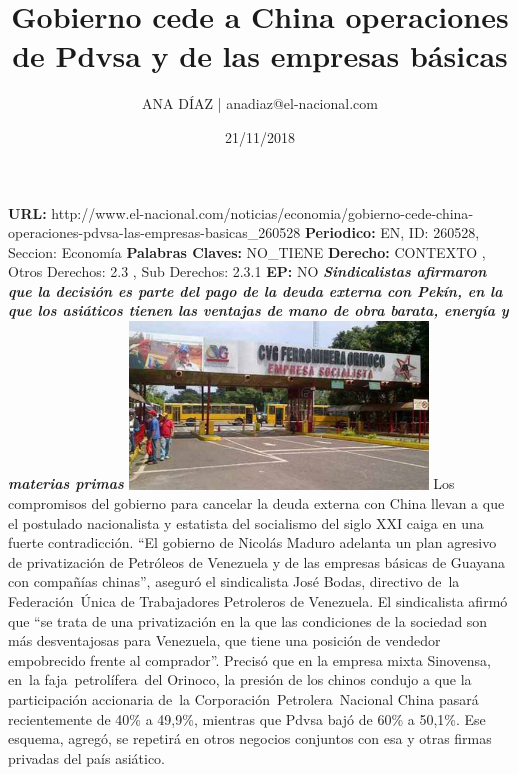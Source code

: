 \documentclass{article}%
\title{\textbf{Gobierno cede a China operaciones de Pdvsa y de las empresas básicas}}%
\author{ANA DÍAZ | anadiaz@el{-}nacional.com}%
\date{21/11/2018}%
\begin{document}
%
\normalsize%
\maketitle%
\textbf{URL: }%
http://www.el{-}nacional.com/noticias/economia/gobierno{-}cede{-}china{-}operaciones{-}pdvsa{-}las{-}empresas{-}basicas\_260528\newline%
%
\textbf{Periodico: }%
EN, %
ID: %
260528, %
Seccion: %
Economía\newline%
%
\textbf{Palabras Claves: }%
NO\_TIENE\newline%
%
\textbf{Derecho: }%
CONTEXTO%
, Otros Derechos: %
2.3%
, Sub Derechos: %
2.3.1%
\newline%
%
\textbf{EP: }%
NO\newline%
\newline%
%
\textbf{\textit{Sindicalistas afirmaron que la decisión es parte del pago de la deuda externa con Pekín, en la que los asiáticos tienen las ventajas de mano de obra barata, energía y materias primas}}%
\newline%
\newline%
%
\includegraphics[width=300px]{219.jpg}%
\newline%
%
Los compromisos del gobierno para cancelar la deuda externa con China llevan a que el postulado nacionalista y estatista del socialismo del siglo XXI caiga en una fuerte contradicción. “El gobierno de Nicolás Maduro adelanta un plan agresivo de privatización de Petróleos de Venezuela y de las empresas básicas de Guayana con compañías chinas”, aseguró el sindicalista José Bodas, directivo de~la Federación~Única de Trabajadores Petroleros de Venezuela.%
\newline%
%
El sindicalista afirmó que “se trata de una privatización en la que las condiciones de la sociedad son más desventajosas para Venezuela, que tiene una posición de vendedor empobrecido frente al comprador”.%
\newline%
%
Precisó que en la empresa mixta Sinovensa, en~la faja~petrolífera~del Orinoco, la presión de los chinos condujo a que la participación accionaria de~la Corporación~Petrolera~Nacional China pasará recientemente de 40\% a 49,9\%, mientras que Pdvsa bajó de 60\% a 50,1\%. Ese esquema, agregó, se repetirá en otros negocios conjuntos con esa y otras firmas privadas del país asiático.%
\end{document}
